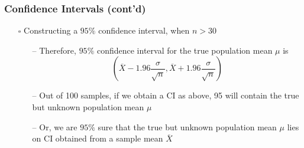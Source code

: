 \documentclass[handout]{beamer}
\begin{document}
\begin{frame}
    \frametitle{Confidence Intervals (cont'd)}
    \begin{itemize}[wide = 0pt]
        \item[$\square$] Constructing a $95\%$ confidence interval, when $n>30$
        \vspace{5pt}
        \begin{itemize}
            \item[--] Therefore, $95\%$ confidence interval for the true population mean $\mu$ is
            \begin{equation*}
                (\overline{X}-1.96\frac{\sigma}{\sqrt{n}}, \overline{X}+1.96\frac{\sigma}{\sqrt{n}})
            \end{equation*}
            \item[--] Out of 100 samples, if we obtain a CI as above, 95 will contain the true but unknown population mean $\mu$
            \item[--] Or, we are $95\%$ sure that the true but unknown population mean $\mu$ lies on CI obtained from a sample mean $\overline{X}$
            \end{itemize}
    \end{itemize}
    \vspace*{\fill}
\end{frame}
\end{document}
